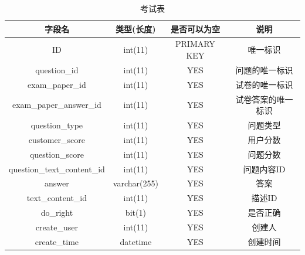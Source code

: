 \begin{enumerate}
	\begin{table}[!htbp]
		\centering
		\begin{tabular}{|c|c|c|c|}
			\hline
			字段名 & 类型(长度) & 是否可以为空 & 说明 \\
			\hline
			ID & int(11) & PRIMARY KEY & 唯一标识 \\
			\hline
			question\_id & int(11) & YES & 问题的唯一标识 \\
			\hline
			exam\_paper\_id & int(11) & YES & 试卷的唯一标识 \\
			\hline
			exam\_paper\_answer\_id & int(11) & YES & 试卷答案的唯一标识 \\
			\hline
			question\_type & int(11) & YES & 问题类型 \\
			\hline
			customer\_score & int(11) & YES & 用户分数 \\
			\hline
			question\_score & int(11) & YES & 问题分数 \\
			\hline
			question\_text\_content\_id & int(11) & YES & 问题内容ID \\
			\hline
			answer & varchar(255) & YES	 & 答案 \\
			\hline
			text\_content\_id & int(11) & YES & 描述ID \\
			\hline
			do\_right & bit(1) & YES & 是否正确 \\
			\hline
			create\_user & int(11) & YES & 创建人 \\
			\hline
			create\_time & datetime & YES & 创建时间 \\
			\hline
		\end{tabular}
		\caption{考试表}
		\label{table:dati}
	\end{table}
\end{enumerate}
